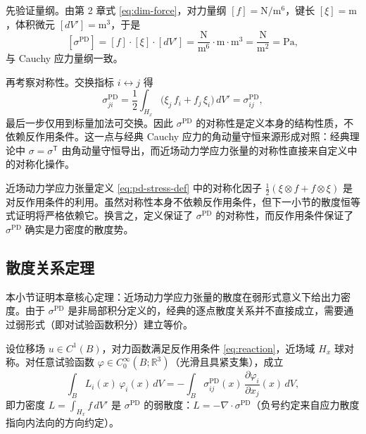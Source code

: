 先验证量纲。由第 2 章式 \eqref{eq:dim-force}，对力量纲 $[f]=\mathrm{N/m^6}$，键长 $[\xi]=\mathrm{m}$，体积微元 $[dV']=\mathrm{m^3}$，于是
\begin{equation}
\label{eq:dim-check}
[\sigma^{\mathrm{PD}}] = [f]\cdot[\xi]\cdot[dV'] = \frac{\mathrm{N}}{\mathrm{m^6}}\cdot\mathrm{m}\cdot\mathrm{m^3} = \frac{\mathrm{N}}{\mathrm{m^2}} = \mathrm{Pa},
\end{equation}
与 Cauchy 应力量纲一致。

再考察对称性。交换指标 $i\leftrightarrow j$ 得
\begin{equation}
\label{eq:symmetry-check}
\sigma^{\mathrm{PD}}_{ji} = \frac{1}{2}\int_{H_x}\bigl(\xi_j\,f_i + f_j\,\xi_i\bigr)\,dV' = \sigma^{\mathrm{PD}}_{ij},
\end{equation}
最后一步仅用到标量加法可交换。因此 $\sigma^{\mathrm{PD}}$ 的对称性是定义本身的结构性质，不依赖反作用条件。这一点与经典 Cauchy 应力的角动量守恒来源形成对照：经典理论中 $\sigma=\sigma^{\mathsf{T}}$ 由角动量守恒导出，而近场动力学应力张量的对称性直接来自定义中的对称化操作。

\begin{remark}
近场动力学应力张量定义 \eqref{eq:pd-stress-def} 中的对称化因子 $\tfrac{1}{2}(\xi\otimes f+f\otimes\xi)$ 是对反作用条件的利用。虽然对称性本身不依赖反作用条件，但下一小节的散度恒等式证明将严格依赖它。换言之，定义保证了 $\sigma^{\mathrm{PD}}$ 的对称性，而反作用条件保证了 $\sigma^{\mathrm{PD}}$ 确实是力密度的散度势。
\end{remark}

\subsection{散度关系定理}
\label{subsec:divergence-theorem}

本小节证明本章核心定理：近场动力学应力张量的散度在弱形式意义下给出力密度。由于 $\sigma^{\mathrm{PD}}$ 是非局部积分定义的，经典的逐点散度关系并不直接成立，需要通过弱形式（即对试验函数积分）建立等价。

\begin{theorem}[散度恒等式]
\label{thm:div-identity}
设位移场 $u\in C^1(B)$，对力函数满足反作用条件 \eqref{eq:reaction}，近场域 $H_x$ 球对称。对任意试验函数 $\varphi\in C_0^\infty(B;\mathbb{R}^3)$（光滑且具紧支集），成立
\begin{equation}
\label{eq:div-identity}
\int_B L_i(x)\,\varphi_i(x)\,dV = -\int_B \sigma^{\mathrm{PD}}_{ij}(x)\,\frac{\partial\varphi_i}{\partial x_j}(x)\,dV,
\end{equation}
即力密度 $L=\int_{H_x}f\,dV'$ 是 $\sigma^{\mathrm{PD}}$ 的弱散度：$L=-\nabla\cdot\sigma^{\mathrm{PD}}$（负号约定来自应力散度指向内法向的方向约定）。
\end{theorem}

